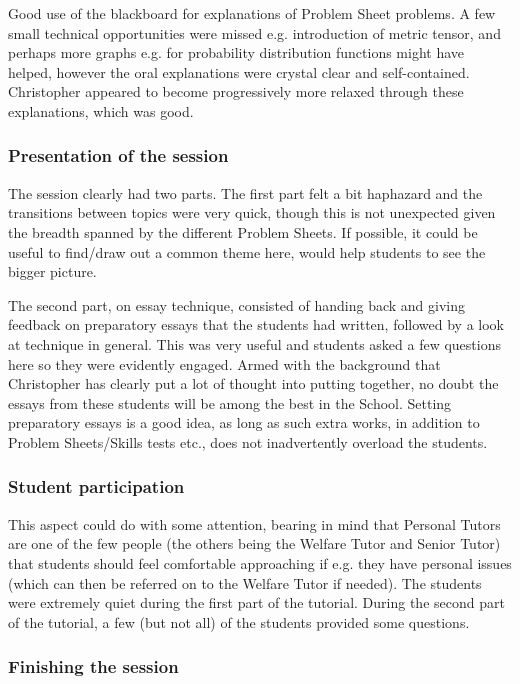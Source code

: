Good use of the blackboard for explanations of Problem Sheet problems. A few small technical opportunities were missed e.g. introduction of metric tensor, and perhaps more graphs e.g. for probability distribution functions might have helped, however the oral explanations were crystal clear and self-contained. Christopher appeared to become progressively more relaxed through these explanations, which was good.

\subsubsection{Presentation of the session}\label{sec:B-presentation}

The session clearly had two parts. The first part felt a bit haphazard and the transitions between topics were very quick, though this is not unexpected given the breadth spanned by the different Problem Sheets. If possible, it could be useful to find/draw out a common theme here, would help students to see the bigger picture.

The second part, on essay technique, consisted of handing back and giving feedback on preparatory essays that the students had written, followed by a look at technique in general. This was very useful and students asked a few questions here so they were evidently engaged. Armed with the background that Christopher has clearly put a lot of thought into putting together, no doubt the essays from these students will be among the best in the School. Setting preparatory essays is a good idea, as long as such extra works, in addition to Problem Sheets/Skills tests etc., does not inadvertently overload the students.

\subsubsection{Student participation}\label{sec:B-participation}

This aspect could do with some attention, bearing in mind that Personal Tutors are one of the few people (the others being the Welfare Tutor and Senior Tutor) that students should feel comfortable approaching if e.g. they have personal issues (which can then be referred on to the Welfare Tutor if needed). The students were extremely quiet during the first part of the tutorial. During the second part of the tutorial, a few (but not all) of the students provided some questions.

\subsubsection{Finishing the session}\label{sec:B-finish}

